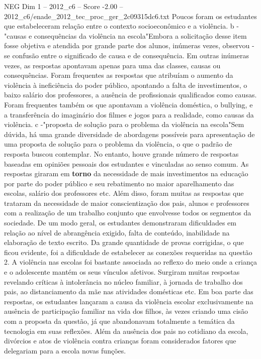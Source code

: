 \begin{textsample}{NEG Dim 1 – 2012\_c6 – Score -2.00 – 2012\_c6/enade\_2012\_tec\_proc\_ger\_2c09315dc6.txt}
Poucos foram os estudantes que estabeleceram relação entre o contexto socioeconômico e a violência. b -"causas e consequências da violência na escola"Embora a solicitação desse item fosse objetiva e atendida por grande parte dos alunos, inúmeras vezes, observou -se confusão entre o significado de causa e de consequência.
Em outras inúmeras vezes, as respostas apontavam apenas para uma das classes, causas ou consequências.
Foram frequentes as respostas que atribuíam o aumento da violência à ineficiência do poder público, apontando a falta de investimentos, o baixo salário dos professores, a ausência de profissionais qualificados como causas.
Foram frequentes também os que apontavam a violência doméstica, o bullying, e a transferência do imaginário dos filmes e jogos para a realidade, como causas da violência. c -"proposta de solução para o problema da violência na escola"Sem dúvida, há uma grande diversidade de abordagens possíveis para apresentação de uma proposta de solução para o problema da violência, o que o padrão de resposta buscou contemplar.
No entanto, houve grande número de respostas baseadas em opiniões pessoais dos estudantes e vinculadas ao senso comum.
As respostas giraram em \textbf{torno} da necessidade de mais investimentos na educação por parte do poder público e seu rebatimento no maior aparelhamento das escolas, salário dos professores etc.
Além disso, foram muitas as respostas que trataram da necessidade de maior conscientização dos pais, alunos e professores com a realização de um trabalho conjunto que envolvesse todos os segmentos da sociedade.
De um modo geral, os estudantes demonstraram dificuldades em relação ao nível de abrangência exigido, falta de conteúdo, inabilidade na elaboração de texto escrito.
Da grande quantidade de provas corrigidas, o que ficou evidente, foi a dificuldade de estabelecer as conexões requeridas na questão 2.
A violência nas escolas foi bastante associada ao reflexo do meio onde a criança e o adolescente mantém os seus vínculos afetivos.
Surgiram muitas respostas revelando críticas à intolerância no núcleo familiar, à jornada de trabalho dos pais, ao distanciamento da mãe nas atividades domésticas etc.
Em boa parte das respostas, os estudantes lançaram a causa da violência escolar exclusivamente na ausência de participação familiar na vida dos filhos, às vezes criando uma cisão com a proposta da questão, já que abandonavam totalmente a temática da tecnologia em suas reflexões.
Além da ausência dos pais no cotidiano da escola, divórcios e atos de violência contra crianças foram considerados fatores que delegariam para a escola novas funções.

\end{textsample}
